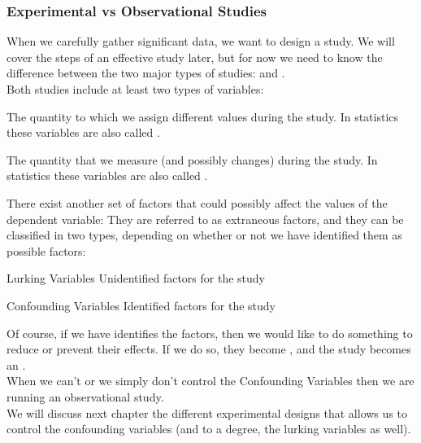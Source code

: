 

\subsubsection{Experimental vs Observational Studies}

When we carefully gather significant data, we want to design a study. We will cover the steps of an effective study later, but for now we need to know the difference between the two major types of studies:  and .
\\

Both studies include at least two types of variables:
\begin{Description}%
\item[\Index{Independent Variables}] The quantity to which we assign different values during the study. In statistics these variables are also called .
\item[\Index{Dependent Variables}] The quantity that we measure (and possibly changes) during the study. In statistics these variables are also called .
\end{Description}

There exist another set of factors that could possibly affect the values of the dependent variable: They are referred to as extraneous factors, and they can be classified in two types, depending on whether or not we have identified them as possible factors: 

\begin{Description}%
\item[Lurking Variables] Unidentified factors for the study
\item[Confounding Variables] Identified factors for the study
\end{Description}

Of course, if we have identifies the factors, then we would like to do something to reduce or prevent their effects. If we do so, they become , and the study becomes an .
\\

When we can't or we simply don't control the Confounding Variables then we are running an observational study.
\\ 
We will discuss next chapter the different experimental designs that allows us to control the confounding variables (and to a degree, the lurking variables as well).


